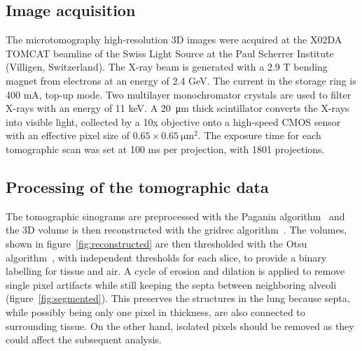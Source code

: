 \subsection{Image acquisition}\label{sec:acquisition}
The microtomography high-resolution 3D images were acquired at the X02DA
TOMCAT beamline of the Swiss Light Source at the Paul Scherrer Institute
(Villigen, Switzerland). The X-ray beam is generated with a 2.9 T bending
magnet from electrons at an energy of 2.4 GeV. The current in the storage
ring is 400 mA, top-up mode. Two multilayer monochromator crystals are used
to filter X-rays with an energy of 11 keV. A \SI{20}{\micro\meter} thick scintillator
converts the X-rays into visible light, collected by a 10x objective onto a
high-speed CMOS sensor with an effective pixel size of $0.65 \times
\SI{0.65}{\micro\meter\squared}$. The exposure time for each tomographic scan was set at 100 ms per
projection, with 1801 projections.

\subsection{Processing of the tomographic data}\label{sec:tomoprocessing}
The tomographic sinograms are preprocessed with the Paganin
algorithm~\cite{Paganin_2002} and
the 3D volume is then reconstructed with the gridrec
algorithm~\cite{Marone:pp5022}. The volumes, shown in
figure~\ref{fig:reconstructed} are then thresholded with the Otsu
algorithm~\cite{Otsu_1979}, with independent thresholds for each slice, to
provide a binary labelling for tissue and air. A cycle of
erosion and dilation is applied to remove single pixel artifacts while still
keeping the septa between neighboring alveoli (figure~\ref{fig:segmented}). This preserves the structures
in the lung because septa, while possibly being only one pixel in thickness,
are also connected to surrounding tissue. On the other hand, isolated pixels
should be removed as they could affect the subsequent analysis.

